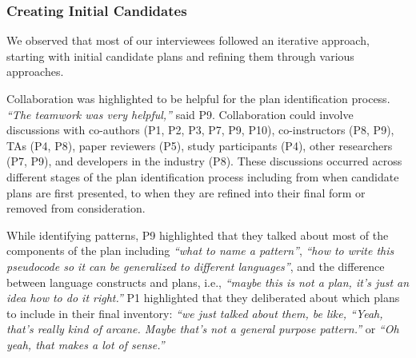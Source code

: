 \subsubsection{Creating Initial Candidates}
\label{sec:process-candidates}

We observed that most of our interviewees followed an iterative approach, starting with initial candidate plans and refining them through various approaches. 

Collaboration was highlighted to be helpful for the plan identification process. \textit{``The teamwork was very helpful,''}  said P9. Collaboration could involve discussions with co-authors (P1, P2, P3, P7, P9, P10), co-instructors (P8, P9), TAs (P4, P8), paper reviewers (P5), study participants (P4), other researchers (P7, P9), and developers in the industry (P8). 
These discussions occurred across different stages of the plan identification process including from when candidate plans are first presented, to when they are refined into their final form or removed from consideration. 


While identifying patterns, P9 highlighted that they talked about most of the components of the plan including \textit{``what to name a pattern''}, 
\textit{``how to write this pseudocode so it can be generalized to different languages''}, and the difference between language constructs and plans, i.e., \textit{``maybe this is not a plan, it's just an idea how to do it right.''}
P1 highlighted that they deliberated about which plans to include in their final inventory: \textit{``we just talked about them, be like, ``Yeah, that's really kind of arcane. Maybe that's not a general purpose pattern.''} or {\textit{``Oh yeah, that makes a lot of sense.''}} 

